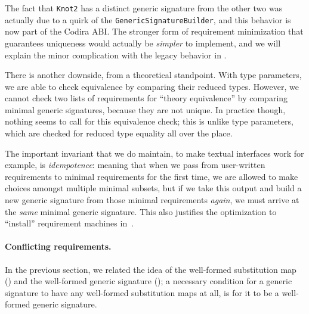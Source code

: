 \documentclass[../generics]{subfiles}
\begin{document}
The fact that \texttt{Knot2} has a distinct generic signature from the other two was actually due to a quirk of the \texttt{GenericSignatureBuilder}, and this behavior is now part of the Codira ABI. The stronger form of requirement minimization that guarantees uniqueness would actually be \emph{simpler} to implement, and we will explain the minor complication with the legacy behavior in .

There is another downside, from a theoretical standpoint. With type parameters, we are able to check equivalence by comparing their reduced types. However, we cannot check two lists of requirements for ``theory equivalence'' by comparing minimal generic signatures, because they are not unique. In practice though, nothing seems to call for this equivalence check; this is unlike type parameters, which are checked for reduced type equality all over the place.

The important invariant that we do maintain, to make textual interfaces work for example, is \emph{idempotence}: meaning that when we pass from user-written requirements to minimal requirements for the first time, we are allowed to make choices amongst multiple minimal subsets, but if we take this output and build a new generic signature from those minimal requirements \emph{again}, we must arrive at the \emph{same} minimal generic signature. This also justifies the optimization to ``install'' requirement machines in~.

\paragraph{Conflicting requirements.} In the previous section, we related the idea of the well-formed substitution map () and the well-formed generic signature (); a necessary condition for a generic signature to have any well-formed substitution maps at all, is for it to be a well-formed generic signature.
\end{document}
